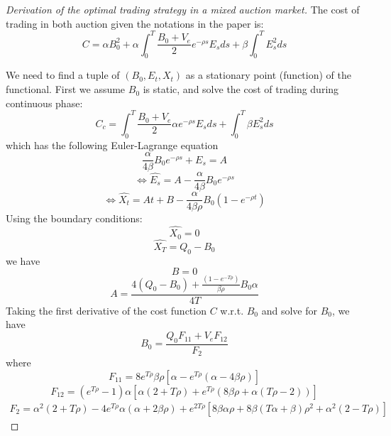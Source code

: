 
\begin{proof}[Derivation of the optimal trading strategy in a mixed auction market]\label{proof:optimal-strategy-mixed-auction}
    The cost of trading in both auction given the notations in the paper is:
    \[
      C = \alpha B_0^2  + \alpha \int_0^T \frac{B_0 + V_e}{2} e^{-\rho s} E_s ds + \beta \int_0^T E_s^2 ds
    \]
  
    We need to find a tuple of $(B_0, E_t, X_t)$ as a stationary point (function) of the functional. First we assume $B_0$ is static, and solve the cost of trading during continuous phase:
    \[
      C_c = \int_0^T \frac{B_0 + V_e}{2} \alpha e^{-\rho s} E_s ds + \int_0^T  \beta E_s^2 ds
    \]
    which has the following Euler-Lagrange equation
    \[
      \frac{\alpha}{4 \beta} B_0  e^{-\rho s} +E_s = A
    \]
    \[
      \Leftrightarrow \hat{E_s} = A - \frac{\alpha}{4 \beta} B_0 e^{-\rho s}
    \]
    \[
      \Leftrightarrow \hat{X_t} = At + B - \frac{\alpha}{4 \beta \rho}B_ 0 (1 - e^{-\rho t})
    \]
    Using the boundary conditions:
    \[
      \hat{X_0} = 0
    \]
    \[
      \hat{X_T} = Q_0 - B_0
    \]
    we have
    \[
      B = 0
    \]
    \[
      A = \frac{4 (Q_0 - B_0) + \frac{(1 - e^{-T \rho})}{\beta \rho} B_0 \alpha} {4 T}
    \]
    Taking the first derivative of the cost function $C$ w.r.t. $B_0$ and solve for $B_0$, we have
    \[
      B_0 = \frac{Q_0 F_{11} + V_e F_{12}}{F_2}
    \]
    where
    \[
      F_{11} = 8 e^{T \rho} \beta \rho [\alpha - e^{T \rho} (\alpha - 4 \beta \rho)]
    \]
    \[
      F_{12} = (e^{T \rho}-1) \alpha [\alpha (2+T \rho) + e^{T \rho} (8 \beta \rho + \alpha (T \rho - 2 ))]
    \]
    \[
      \begin{split}
        F_2 = \alpha^2 (2 + T \rho) - 4 e^{T \rho} \alpha (\alpha + 2 \beta \rho)
        + e^{2 T \rho} [8 \beta \alpha \rho + 8 \beta (T \alpha + \beta) \rho^2 + \alpha^2 (2 - T \rho)]
      \end{split}
    \]
  
  \end{proof}
  